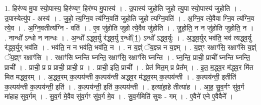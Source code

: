 \documentclass[17pt]{extarticle}
\begin{document}
1. हिर॑ण्य मु॒पा स्यो॒पास्य॒ हिर॑ण्यꣳ॒॒ हिर॑ण्य मु॒पास्य॑ । . उ॒पास्य॑ जुहोति जुहो त्यु॒पा स्यो॒पास्य॑ जुहोति । . उ॒पास्येत्यु॑प - अस्य॑ । . जु॒हो॒ त्य॒ग्नि॒व त्य॑ग्नि॒वति॑ जुहोति जुहो त्यग्नि॒वति॑ । . अ॒ग्नि॒व त्ये॒वैवा ग्नि॒व त्य॑ग्नि॒व त्ये॒व । . अ॒ग्नि॒वतीत्य॑ग्नि - वति॑ । . ए॒व जु॑होति जुहो त्ये॒वैव जु॑होति । . जु॒हो॒ति॒ न न जु॑होति जुहोति॒ न । . नान्धो᳚ ऽन्धो न नान्धः । . अ॒न्धो᳚ ऽद्ध्व॒र्यु र॑द्ध्व॒र्यु र॒न्धो᳚(1॒) ऽन्धो᳚ ऽद्ध्व॒र्युः । . अ॒द्ध्व॒र्युर् भव॑ति॒ भव॑ त्यद्ध्व॒र्यु र॑द्ध्व॒र्युर् भव॑ति । . भव॑ति॒ न न भव॑ति॒ भव॑ति॒ न । . न य॒ज्ञ्ं ॅय॒ज्ञ्न्न न य॒ज्ञ्म् । . य॒ज्ञ्ꣳ रक्षाꣳ॑सि॒ रक्षाꣳ॑सि य॒ज्ञ्ं ॅय॒ज्ञ्ꣳ रक्षाꣳ॑सि । . रक्षाꣳ॑सि घ्नन्ति घ्नन्ति॒ रक्षाꣳ॑सि॒ रक्षाꣳ॑सि घ्नन्ति । . घ्न॒न्ति॒ प्राची॒ प्राची᳚ घ्नन्ति घ्नन्ति॒ प्राची᳚ । . प्राची॒ प्र प्र प्राची॒ प्राची॒ प्र । . प्राची॒ इति॒ प्राची᳚ । . प्रेत॑ मित॒म् प्र प्रेत᳚म् । . इ॒त॒ म॒द्ध्व॒र म॑द्ध्व॒र मि॑त मित मद्ध्व॒रम् । . अ॒द्ध्व॒रम् क॒ल्पय॑न्ती क॒ल्पय॑न्ती अद्ध्व॒र म॑द्ध्व॒रम् क॒ल्पय॑न्ती । . क॒ल्पय॑न्ती॒ इतीति॑ क॒ल्पय॑न्ती क॒ल्पय॑न्ती॒ इति॑ । . क॒ल्पय॑न्ती॒ इति॑ क॒ल्पय॑न्ती । . इत्या॑हा॒हे तीत्या॑ह । . आ॒ह॒ सु॒व॒र्गꣳ सु॑व॒र्ग मा॑हाह सुव॒र्गम् । . सु॒व॒र्ग मे॒वैव सु॑व॒र्गꣳ सु॑व॒र्ग मे॒व । . सु॒व॒र्गमिति॑ सुवः - गम् । . ए॒वैने॑ एने ए॒वैवैने᳚ । \newline
\end{document}
